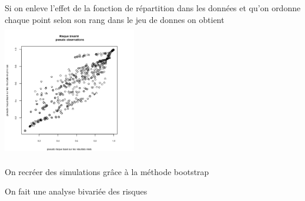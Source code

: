 \begin{frame}
	Si on enleve l'effet de la fonction de répartition dans les données et qu'on ordonne chaque point selon son rang dans le jeu de donnes on obtient
\includegraphics[width=220px, height=220px]{pseudo_risque_bivarie}	
	
\end{frame}



\item On recréer des simulations grâce à la méthode bootstrap 
\item On fait une analyse bivariée des risques
